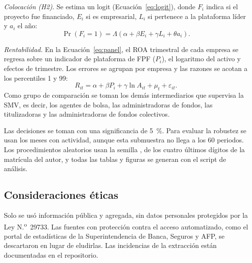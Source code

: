 \textit{Colocación (H2).} Se estima un logit (Ecuación~\ref{eq:logit}), donde $F_i$ indica si el proyecto fue financiado, $E_i$ si es empresarial, $L_i$ si pertenece a la plataforma líder y $a_i$ el año:
\begin{equation}\label{eq:logit}
\Pr(F_i=1)=\Lambda(\alpha+\beta E_i+\gamma L_i+\theta a_i).
\end{equation}

\textit{Rentabilidad.} En la Ecuación~\ref{eq:panel}, el ROA trimestral de cada empresa se regresa sobre un indicador de plataforma de FPF ($P_i$), el logaritmo del activo y efectos de trimestre. Los errores se agrupan por empresa y las razones se acotan a los percentiles 1 y 99:
\begin{equation}\label{eq:panel}
R_{it}=\alpha+\beta P_i+\gamma\ln A_{it}+\mu_t+\varepsilon_{it}.
\end{equation}
Como grupo de comparación se toman los demás intermediarios que supervisa la SMV, es decir, los agentes de bolsa, las administradoras de fondos, las titulizadoras y las administradoras de fondos colectivos.

Las decisiones se toman con una significancia de 5~\%. Para evaluar la robustez se usan los  meses con actividad, aunque esta submuestra no llega a los 60 periodos. Los procedimientos aleatorios usan la semilla , de los cuatro últimos dígitos de la matrícula del autor, y todas las tablas y figuras se generan con el script de análisis.

\subsection{Consideraciones éticas}

Solo se usó información pública y agregada, sin datos personales protegidos por la Ley N.\textsuperscript{o}~29733. Las fuentes con protección contra el acceso automatizado, como el portal de estadísticas de la Superintendencia de Banca, Seguros y AFP, se descartaron en lugar de eludirlas. Las incidencias de la extracción están documentadas en el repositorio.
